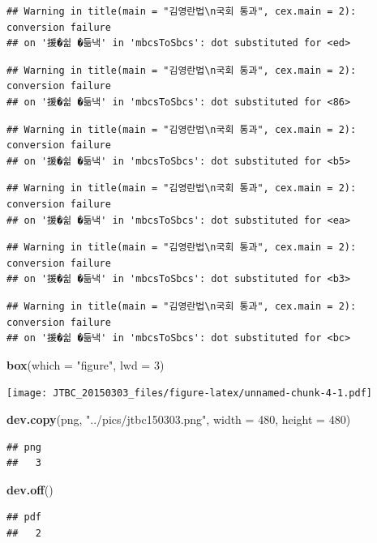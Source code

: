 \documentclass[
]{article}
\newenvironment{Shaded}{\begin{snugshade}}{\end{snugshade}}
\newcommand{\DataTypeTok}[1]{\textcolor[rgb]{0.13,0.29,0.53}{#1}}
\newcommand{\DecValTok}[1]{\textcolor[rgb]{0.00,0.00,0.81}{#1}}
\newcommand{\KeywordTok}[1]{\textcolor[rgb]{0.13,0.29,0.53}{\textbf{#1}}}
\newcommand{\NormalTok}[1]{#1}
\newcommand{\StringTok}[1]{\textcolor[rgb]{0.31,0.60,0.02}{#1}}
\begin{document}
\begin{verbatim}
## Warning in title(main = "김영란법\n국회 통과", cex.main = 2): conversion failure
## on '援�쉶 �듦낵' in 'mbcsToSbcs': dot substituted for <ed>
\end{verbatim}

\begin{verbatim}
## Warning in title(main = "김영란법\n국회 통과", cex.main = 2): conversion failure
## on '援�쉶 �듦낵' in 'mbcsToSbcs': dot substituted for <86>
\end{verbatim}

\begin{verbatim}
## Warning in title(main = "김영란법\n국회 통과", cex.main = 2): conversion failure
## on '援�쉶 �듦낵' in 'mbcsToSbcs': dot substituted for <b5>
\end{verbatim}

\begin{verbatim}
## Warning in title(main = "김영란법\n국회 통과", cex.main = 2): conversion failure
## on '援�쉶 �듦낵' in 'mbcsToSbcs': dot substituted for <ea>
\end{verbatim}

\begin{verbatim}
## Warning in title(main = "김영란법\n국회 통과", cex.main = 2): conversion failure
## on '援�쉶 �듦낵' in 'mbcsToSbcs': dot substituted for <b3>
\end{verbatim}

\begin{verbatim}
## Warning in title(main = "김영란법\n국회 통과", cex.main = 2): conversion failure
## on '援�쉶 �듦낵' in 'mbcsToSbcs': dot substituted for <bc>
\end{verbatim}

\begin{Shaded}
\begin{Highlighting}[]
\KeywordTok{box}\NormalTok{(}\DataTypeTok{which =} \StringTok{"figure"}\NormalTok{, }\DataTypeTok{lwd =} \DecValTok{3}\NormalTok{)}
\end{Highlighting}
\end{Shaded}

\texttt{[image: JTBC\_20150303\_files/figure-latex/unnamed-chunk-4-1.pdf]}

\begin{Shaded}
\begin{Highlighting}[]
\KeywordTok{dev.copy}\NormalTok{(png, }\StringTok{"../pics/jtbc150303.png"}\NormalTok{, }\DataTypeTok{width =} \DecValTok{480}\NormalTok{, }\DataTypeTok{height =} \DecValTok{480}\NormalTok{)}
\end{Highlighting}
\end{Shaded}

\begin{verbatim}
## png 
##   3
\end{verbatim}

\begin{Shaded}
\begin{Highlighting}[]
\KeywordTok{dev.off}\NormalTok{()}
\end{Highlighting}
\end{Shaded}

\begin{verbatim}
## pdf 
##   2
\end{verbatim}
\end{document}
